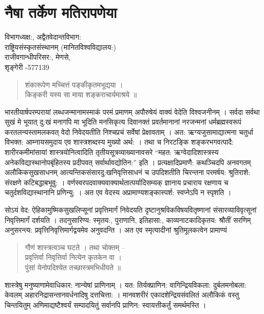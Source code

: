 \chapter{नैषा तर्केण मतिरापणेया}

\begin{center}
\smallskip

विभागध्यक्ष:, अद्वैतवेदान्तविभाग:\\
राष्ट्रियसंस्कृतसंस्थानम् (मानितविश्वविद्यालय:)\\
राजीवगान्धीपरिसर:, मेणसे,\\ 
शृङ्गेरी -577139
\end{center}

\begin{verse}
शंकारूपेण मच्चित्तं पङ्कीकृतमभूद्यया ।\\
किङ्करी यस्य सा माया शङ्कराचार्यमाश्रये ॥
\end{verse}

भारतीयार्षपरम्परायां लब्धजन्मानामस्माकं परमं प्रमाणम् अपौरुषेयं वाक्यं वेदेति विश्वजनीनम् । सर्वदा सर्वथा सुखं मे भूयात् दु:खं मनागपि मा  भूदिति मनसिकृत्य दिवानक्तं प्रवर्तमानानां नरजन्मनां धर्मब्रह्मस्वरूपं करतलन्यस्तामलकवत् वेदो निवेदयतीति निश्चप्रचं सर्वेषां प्रेक्षावताम् । अत: ऋग्यजुसामाद्यात्मना चतुर्धा विभक्त: आम्नायसमुदाय एव शास्त्रशब्दस्य मुख्यो अर्थ: । तथा च निरटङ्कि शङ्करभगवत्पादै: शारीरकमीमांसायां शास्त्रयोनित्वादिति तृतीयसूत्रव्याख्यानावसरे “महत: ऋग्वेदादिशास्त्रस्य अनेकविद्यास्थानोपबृंहितस्य प्रदीपवत् सर्वार्थावद्योतिन:” इति । प्रत्यक्षादिप्रमाणै: कथञ्चिदपि अनवगतम् अलौकिकसुखसाधनम् आत्यन्तिकसंसारदु:खनिवृत्तिसाधनं च उपदिशतीति चिरन्तना परमर्षय: श्रुतिराशे: संरक्षणे कटिबद्धाबभूवु: । वर्णस्वरपदवाक्यवाक्यार्थतात्पर्यादिसम्यक् ज्ञानाय प्रचाराय रक्षणाय च चतुर्दशविद्यास्थानानि प्रणिन्यु: । अत एव वेदस्य अप्रामाण्यशङ्कास्पर्श: स्वप्नेऽपि न स्पृशति ।

सोऽयं वेद: ऐहिकामुष्मिकसुखलिप्सूनां प्रवृत्तिमार्गं निवेदयति दृष्टानुश्रविकविषयवितृष्णानां संसारव्याविवृत्सूनां निवृत्तिमार्गं दर्शयति । तदनुसारिण्य: स्मृतय:, पुराणानि, इतिहासा:, काव्यनाटकादिकृतय: श्रौतीं सरणिम् अनुसरन्त्य: प्रवृत्तिनिवृत्तिमार्गद्वयमेव अनुवदन्ति । अत एव स्मृत्यादीनां श्रुतिमूलकत्वेन प्रामाण्यं
\begin{verse}
गौणं शास्त्रत्वञ्च घटते । तथा चोक्तम् –\\
प्रवृत्तिर्वा निवृत्तिर्वा नित्येन कृतकेन वा ।\\
पुंसां येनोपदिश्येत तच्छास्त्रमभिधीयते ॥
\end{verse}

शास्त्रेषु मनुष्याणामेवाधिकार: नान्येषां प्राणिनाम् । यत: तिर्यक्प्राणिन: वागिन्द्रियविकला: दुर्बलमनोबला: केवलम् अहारनिद्रासन्तानवर्धनादिषु दत्तचित्ता: । मानवशरीरं एकादशेन्द्रियसंवलितं अलौकिकं वस्तु चिन्तयितुम् अणिमाद्यष्टैश्वर्यं सम्पादयितुं सर्वानपि प्राणिन: स्वायत्तीकर्तुं समर्थमस्ति ।

